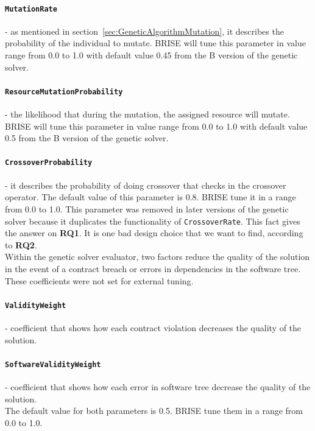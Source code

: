	 \paragraph{\texttt{MutationRate}} - as mentioned in section~\ref{sec:GeneticAlgorithmMutation}, it describes the probability of the individual to mutate. BRISE will tune this parameter in value range from 0.0 to 1.0 with default value 0.45 from the B version of the genetic solver.
	 \paragraph{\texttt{ResourceMutationProbability}} - the likelihood that during the mutation, the assigned resource will mutate. BRISE will tune this parameter in value range from 0.0 to 1.0 with default value 0.5 from the B version of the genetic solver.
	 \paragraph{\texttt{CrossoverProbability}} - it describes the probability of doing crossover that checks in the crossover operator. The default value of this parameter is 0.8. BRISE tune it in a range from 0.0 to 1.0. This parameter was removed in later versions of the genetic solver because it duplicates the functionality of \texttt{CrossoverRate}. This fact gives the answer on \textbf{RQ1}. It is one bad design choice that we want to find, according to \textbf{RQ2}.\\ 
	 

Within the genetic solver evaluator, two factors reduce the quality of the solution in the event of a contract breach or errors in dependencies in the software tree. These coefficients were not set for external tuning.
	 \paragraph{\texttt{ValidityWeight}} - coefficient that shows how each contract violation decreases  the quality of the solution.
	 \paragraph{\texttt{SoftwareValidityWeight}} - coefficient that shows how each error in software tree decrease the quality of the solution.\\

The default value for both parameters is 0.5. BRISE tune them in a range from 0.0 to 1.0.
	 
